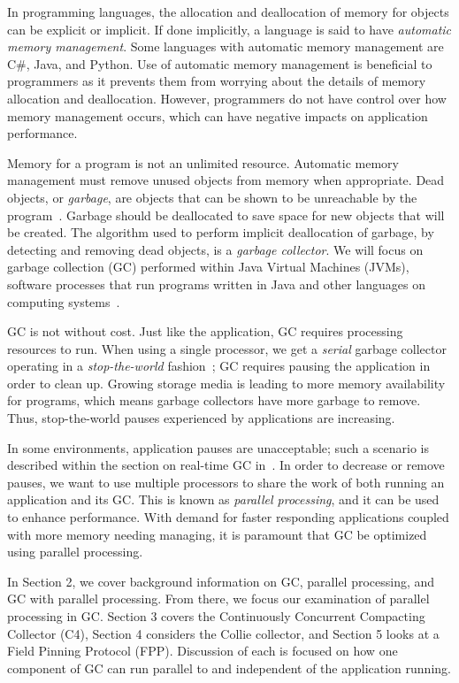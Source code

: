 \documentclass{sig-alternate}
\begin{document}
In programming languages, the allocation and deallocation
of memory for objects can be explicit or implicit. If done implicitly,
a language is said to have \emph{automatic memory management}. Some languages 
with automatic memory management are C\#, Java, and Python.
Use of automatic memory management is beneficial to programmers as it 
prevents them from worrying about the details of memory allocation and deallocation. 
However, programmers do not have control over how memory management occurs,
which can have negative impacts on application performance.

Memory for a program is not an unlimited resource. Automatic memory management
must remove unused objects from memory when appropriate.
Dead objects, or \emph{garbage}, are objects that can be shown
to be unreachable by the program~\cite{glossary:g}. Garbage should be deallocated to 
save space for new objects that will be created. The algorithm used to perform implicit
deallocation of garbage, by detecting and removing dead objects, 
is a \emph{garbage collector}.
We will focus on
garbage collection (GC) performed within Java Virtual Machines 
(JVMs), software processes that run programs written in Java and other languages 
on computing systems~\cite{Lindblom:2011}.

GC is not without cost.
Just like the application, GC requires processing resources to run. When using a single processor, 
we get a \emph{serial} garbage collector operating in a 
\emph{stop-the-world} fashion~\cite{Lindblom:2011}; GC requires
pausing the application in order to clean up. 
Growing storage media is leading to more memory
availability for programs, which means garbage collectors
have more garbage to remove. Thus, stop-the-world pauses
experienced by applications are increasing.

In some environments,
application pauses are unacceptable; such a scenario is described within the section on 
real-time GC in~\cite{Lindblom:2011}. In order to decrease or remove 
pauses, we want to use multiple
processors to share the work of both running an application and its GC.
This is known as \emph{parallel processing}, and it can be used
to enhance performance. With
demand for faster responding applications coupled with more memory needing managing,
it is paramount that GC be optimized using parallel processing. 

In Section 2, we cover background information on GC, parallel processing,
and GC with parallel processing.
From there, we focus our examination of parallel processing in GC.
Section 3 covers the Continuously Concurrent Compacting Collector (C4), Section
4 considers the Collie collector, and Section 5 looks at a Field Pinning Protocol (FPP).
Discussion of each is focused on how one component of GC can run parallel to
and independent of the application running. 
\end{document}
